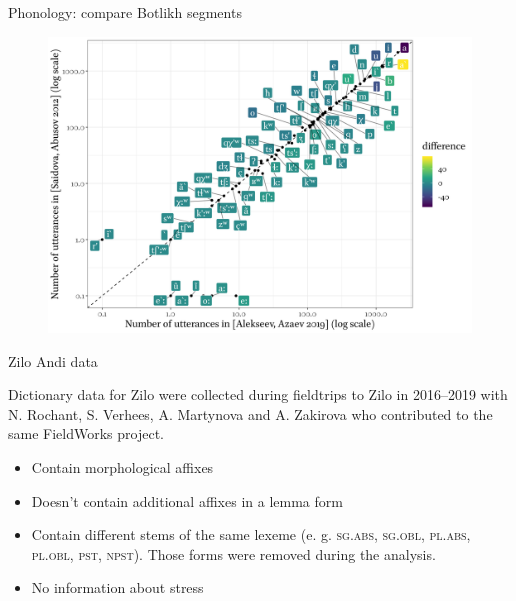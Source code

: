 \begin{frame}{Phonology: compare Botlikh segments}
\begin{figure}[h]
\centering
\includegraphics[width = \linewidth]{images/05_compare_botlikh_dicts_without_stress.png}
\end{figure}
\end{frame}

\begin{frame}{Zilo Andi data}

Dictionary data for Zilo were collected during fieldtrips to Zilo in 2016–2019 with N. Rochant, S. Verhees, A. Martynova and A. Zakirova who contributed to the same FieldWorks project.

\begin{itemize}
    \item Contain morphological affixes
    \item Doesn’t contain additional affixes in a lemma form
    \item Contain different stems of the same lexeme (e. g. \textsc{sg.abs, sg.obl, pl.abs, pl.obl, pst, npst}). Those forms were removed during the analysis.
    \item No information about stress
\end{itemize}

\end{frame}

